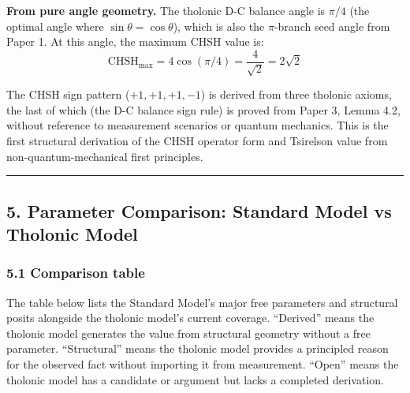 \documentclass[
  11pt,
  letterpaper,
]{article}
\begin{document}
\textbf{From pure angle geometry.} The tholonic D-C balance angle is
\(\pi/4\) (the optimal angle where \(\sin\theta = \cos\theta\)), which
is also the \(\pi\)-branch seed angle from Paper 1. At this angle, the
maximum CHSH value is:
\[\text{CHSH}_{\max} = 4\cos(\pi/4) = \frac{4}{\sqrt{2}} = 2\sqrt{2}\]

The CHSH sign pattern (\(+1, +1, +1, -1\)) is derived from three
tholonic axioms, the last of which (the D-C balance sign rule) is proved
from Paper 3, Lemma 4.2, without reference to measurement scenarios or
quantum mechanics. This is the first structural derivation of the CHSH
operator form and Tsirelson value from non-quantum-mechanical first
principles.

\begin{center}\rule{0.5\linewidth}{0.5pt}\end{center}

\subsection{5. Parameter Comparison: Standard Model vs Tholonic
Model}\label{parameter-comparison-standard-model-vs-tholonic-model}

\subsubsection{5.1 Comparison table}\label{comparison-table}

The table below lists the Standard Model's major free parameters and
structural posits alongside the tholonic model's current coverage.
``Derived'' means the tholonic model generates the value from structural
geometry without a free parameter. ``Structural'' means the tholonic
model provides a principled reason for the observed fact without
importing it from measurement. ``Open'' means the tholonic model has a
candidate or argument but lacks a completed derivation.
\end{document}
